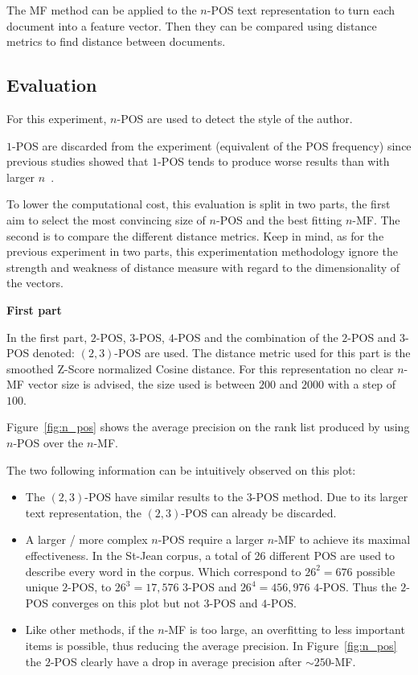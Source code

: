 The MF method can be applied to the $n$-POS text representation to turn each document into a feature vector.
Then they can be compared using distance metrics to find distance between documents.

\subsection{Evaluation}

For this experiment, $n$-POS are used to detect the style of the author.

$1$-POS are discarded from the experiment (equivalent of the POS frequency) since previous studies showed that $1$-POS tends to produce worse results than with larger $n$~\cite{kocher_linking}.

To lower the computational cost, this evaluation is split in two parts, the first aim to select the most convincing size of $n$-POS and the best fitting $n$-MF.
The second is to compare the different distance metrics.
Keep in mind, as for the previous experiment in two parts, this experimentation methodology ignore the strength and weakness of distance measure with regard to the dimensionality of the vectors.

\textbf{First part}

In the first part, $2$-POS, $3$-POS, $4$-POS and the combination of the $2$-POS and $3$-POS denoted: $(2, 3)$-POS are used.
The distance metric used for this part is the smoothed Z-Score normalized Cosine distance.
For this representation no clear $n$-MF vector size is advised, the size used is between $200$ and $2000$ with a step of $100$.

Figure~\ref{fig:n_pos} shows the average precision on the rank list produced by using $n$-POS over the $n$-MF.

The two following information can be intuitively observed on this plot:
\begin{itemize}
  \item
  The $(2, 3)$-POS have similar results to the $3$-POS method.
  Due to its larger text representation, the $(2, 3)$-POS can already be discarded.
  \item
  A larger / more complex $n$-POS require a larger $n$-MF to achieve its maximal effectiveness.
  In the St-Jean corpus, a total of 26 different POS are used to describe every word in the corpus.
  Which correspond to $26^2 = 676$ possible unique $2$-POS, to $26^3 = 17,576$ $3$-POS and $26^4 = 456,976$ $4$-POS.
  Thus the $2$-POS converges on this plot but not $3$-POS and $4$-POS.
  \item
  Like other methods, if the $n$-MF is too large, an overfitting to less important items is possible, thus reducing the average precision.
  In Figure~\ref{fig:n_pos} the $2$-POS clearly have a drop in average precision after $\sim 250$-MF.
\end{itemize}

